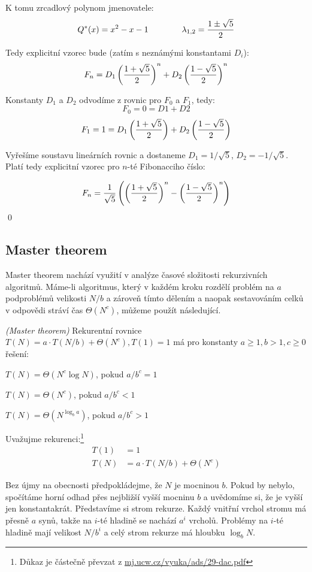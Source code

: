K tomu zrcadlový polynom jmenovatele:
$$Q^*(x) = x^2-x-1\qquad\qquad\lambda_{1,2} = {1\pm\sqrt 5\over 2}$$

Tedy explicitní vzorec bude (zatím s neznámými konstantami $D_i$):
$$F_n = D_1\left({1+\sqrt 5\over 2}\right)^n + D_2\left({1-\sqrt 5\over 2}\right)^n$$

Konstanty $D_1$ a $D_2$ odvodíme z rovnic pro $F_0$ a $F_1$, tedy:
$$F_0 = 0 = D1 + D2$$
$$F_1 = 1 = D_1\left({1+\sqrt 5\over 2}\right) + D_2\left({1-\sqrt 5\over 2}\right)$$

Vyřešíme soustavu lineárních rovnic a dostaneme $D_1 = 1/\sqrt 5$, $D_2 =
-1/\sqrt 5$. Platí tedy explicitní vzorec pro $n$-té Fibonacciho číslo:

$$F_n = {1\over\sqrt 5}\left(\left({1+\sqrt 5\over 2}\right)^n - \left({1-\sqrt 5\over 2}\right)^n\right)$$
\qed

\subsection{Master theorem}

Master theorem nachází využití v analýze časové složitosti rekurzivních
algoritmů. Máme-li algoritmus, který v každém kroku rozdělí problém na $a$
podproblémů velikosti $N/b$ a zároveň tímto dělením a naopak sestavováním
celků v odpovědi stráví čas $\Theta(N^c)$, můžeme použít následující.

\vt \emph{(Master theorem)} Rekurentní rovnice $T(N) = a\cdot T(N/b) + \Theta(N^c), T(1) = 1$ má pro konstanty $a \ge 1, b > 1, c\ge 0$ řešení:
\begin{itemize*}
\item $T(N) = \Theta(N^c \log N)$, pokud $a/b^c = 1$
\item $T(N) = \Theta(N^c)$, pokud $a/b^c < 1$
\item $T(N) = \Theta(N^{\log_b a})$, pokud $a/b^c > 1$
\end{itemize*}

\dk Uvažujme rekurenci:\footnote{Důkaz je částečně převzat z \url{mj.ucw.cz/vyuka/ads/29-dac.pdf}}
\begin{align*}
T(1) &= 1 \\
T(N) &= a\cdot T(N/b) + \Theta(N^c)
\end{align*}

Bez újmy na obecnosti předpokládejme, že $N$ je mocninou $b$. Pokud by nebylo,
spočítáme horní odhad přes nejbližší vyšší mocninu $b$ a uvědomíme si, že je
vyšší jen konstantakrát. Představíme si strom rekurze. Každý vnitřní vrchol
stromu má přesně $a$ synů, takže na $i$-té hladině se nachází $a^i$ vrcholů.
Problémy na $i$-té hladině mají velikost $N/b^i$ a celý strom rekurze má
hloubku $\log_b N$.

